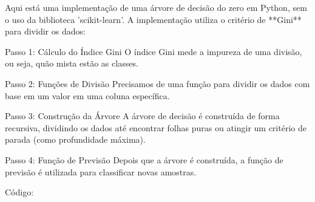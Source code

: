 \documentclass[12pt]{article}
\begin{document}
Aqui está uma implementação de uma árvore de decisão do zero em Python, sem o uso da biblioteca 'scikit-learn'. A implementação utiliza o critério de **Gini** para dividir os dados:

Passo 1: Cálculo do Índice Gini
O índice Gini mede a impureza de uma divisão, ou seja, quão mista estão as classes.

Passo 2: Funções de Divisão
Precisamos de uma função para dividir os dados com base em um valor em uma coluna específica.

Passo 3: Construção da Árvore
A árvore de decisão é construída de forma recursiva, dividindo os dados até encontrar folhas puras ou atingir um critério de parada (como profundidade máxima).

Passo 4: Função de Previsão
Depois que a árvore é construída, a função de previsão é utilizada para classificar novas amostras.

Código:
\end{document}
